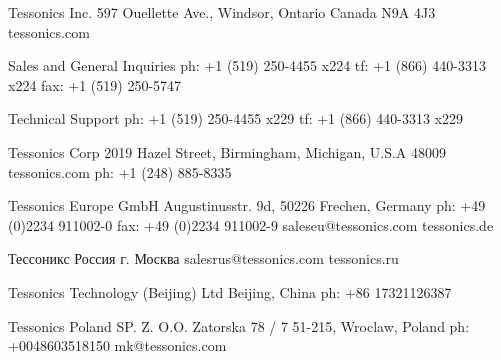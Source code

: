 
\startmakeup[top=,bottom=]


\vfill

\blank[2em]

\startcolumns[n=3,separator=rule,rulecolor=tesclr,distance=50pt]

\startlines[style=\ss\tfx]
Tessonics Inc.
597 Ouellette Ave.,
Windsor, Ontario
Canada N9A 4J3
tessonics.com

Sales and General Inquiries
ph: +1 (519) 250-4455 x224
tf: +1 (866) 440-3313 x224
fax: +1 (519) 250-5747

Technical Support
ph: +1 (519) 250-4455 x229
tf: +1 (866) 440-3313 x229
\stoplines

\column

\startlines[style=\ss\tfx]
Tessonics Corp
2019 Hazel Street,
Birmingham, Michigan,
U.S.A 48009
tessonics.com
ph: +1 (248) 885-8335
\stoplines

\startlines[style=\ss\tfx]
Tessonics Europe GmbH
Augustinusstr. 9d,
50226 Frechen, Germany
ph: +49 (0)2234 911002-0
fax: +49 (0)2234 911002-9
saleseu@tessonics.com
tessonics.de
\stoplines

\column

\startlines[style=\ss\tfx]
Тессоникс Россия
г. Москва
salesrus@tessonics.com
tessonics.ru
\stoplines

\startlines[style=\ss\tfx]
Tessonics Technology
(Beijing) Ltd
Beijing, China
ph: +86 17321126387
\stoplines

\startlines[style=\ss\tfx]
Tessonics Poland SP. Z. O.O.
Zatorska 78 / 7 51-215,
Wroclaw, Poland
ph: +0048603518150
mk@tessonics.com
\stoplines

\stopcolumns

\stopmakeup